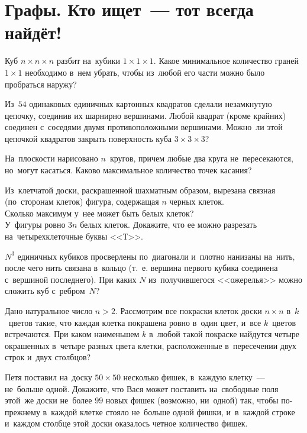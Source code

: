
\section*{Графы. Кто ищет~--- тот всегда найдёт!}


\begin{problems}

\item
Куб $n \times n \times n$ разбит на~кубики $1 \times 1 \times 1$.
Какое минимальное количество граней $1 \times 1$ необходимо в~нем убрать, чтобы
из~любой его части можно было пробраться наружу?

\item
Из~$54$ одинаковых единичных картонных квадратов сделали незамкнутую цепочку,
соединив их шарнирно вершинами.
Любой квадрат (кроме крайних) соединен с~соседями двумя противоположными
вершинами.
Можно~ли этой цепочкой квадратов закрыть поверхность куба
$3 \times 3 \times 3$?

\item
На~плоскости нарисовано $n$~кругов, причем любые два круга не~пересекаются,
но~могут касаться.
Каково максимальное количество точек касания?

\item
Из~клетчатой доски, раскрашенной шахматным образом, вырезана связная
(по~сторонам клеток) фигура, содержащая $n$ черных клеток.
\\
\subproblem
Сколько максимум у~нее может быть белых клеток?
\\
\subproblem
У~фигуры ровно $3n$ белых клеток.
Докажите, что ее можно разрезать на~четырехклеточные буквы <<Т>>.

\item
$N^3$ единичных кубиков просверлены по~диагонали и~плотно нанизаны на~нить,
после чего нить связана в~кольцо (т.~е. вершина первого кубика соединена
с~вершиной последнего).
При каких $N$ из~получившегося <<ожерелья>> можно сложить куб с~ребром~$N$?

\item
Дано натуральное число $n > 2$.
Рассмотрим все покраски клеток доски $n \times n$ в~$k$~цветов такие, что
каждая клетка покрашена ровно в~один цвет, и~все $k$~цветов встречаются.
При каком наименьшем $k$ в~любой такой покраске найдутся четыре окрашенных
в~четыре разных цвета клетки, расположенные в~пересечении двух строк и~двух
столбцов?

\item
Петя поставил на~доску $50 \times 50$ несколько фишек, в~каждую клетку~---
не~больше одной.
Докажите, что Вася может поставить на~свободные поля этой~же доски не~более
$99$ новых фишек (возможно, ни~одной) так, чтобы по-прежнему в~каждой клетке
стояло не~больше одной фишки, и~в~каждой строке и~каждом столбце этой доски
оказалось четное количество фишек.

\end{problems}

